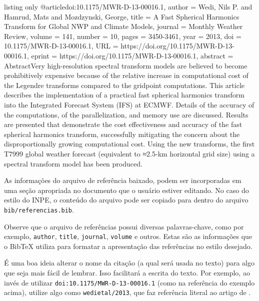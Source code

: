 \begin{texexp}{listing only}
@article{doi:10.1175/MWR-D-13-00016.1,
author   = {Wedi, Nils P. and Hamrud, Mats and Mozdzynski, George},
title    = {A Fast Spherical Harmonics Transform for Global NWP and Climate Models},
journal  = {Monthly Weather Review},
volume   = {141},
number   = {10},
pages    = {3450-3461},
year     = {2013},
doi      = {10.1175/MWR-D-13-00016.1},
URL      = {https://doi.org/10.1175/MWR-D-13-00016.1},
eprint   = {https://doi.org/10.1175/MWR-D-13-00016.1},
abstract = { AbstractVery high-resolution spectral transform models are believed to become prohibitively expensive because of the relative increase in computational cost of the Legendre transforms compared to the gridpoint computations. This article describes the implementation of a practical fast spherical harmonics transform into the Integrated Forecast System (IFS) at ECMWF. Details of the accuracy of the computations, of the parallelization, and memory use are discussed. Results are presented that demonstrate the cost effectiveness and accuracy of the fast spherical harmonics transform, successfully mitigating the concern about the disproportionally growing computational cost. Using the new transforms, the first T7999 global weather forecast (equivalent to ≈2.5-km horizontal grid size) using a spectral transform model has been produced.}
}
\end{texexp}

As informações do arquivo de referência baixado, podem ser incorporadas em uma seção apropriada no documento que o usuário estiver editando. No caso do estilo do INPE, o conteúdo do arquivo pode ser copiado para dentro do arquivo {\tt bib/referencias.bib}.

Observe que o arquivo de referências possui diversas palavras-chave, como por exemplo, {\tt author}, {\tt title}, {\tt journal}, {\tt volume} e outros. Estas são as informações que o BibTeX utiliza para formatar a apresentação das referências no estilo desejado.

\begin{marker}
  É uma boa ideia alterar o nome da citação (a qual será usada no texto) para algo que seja mais fácil de lembrar. Isso facilitará a escrita do texto. Por exemplo, ao invés de utilizar {\tt doi:10.1175/MWR-D-13-00016.1} (como na referência do exemplo acima), utilize algo como {\tt wedietal/2013}, que faz referência literal ao artigo de .
\end{marker}

